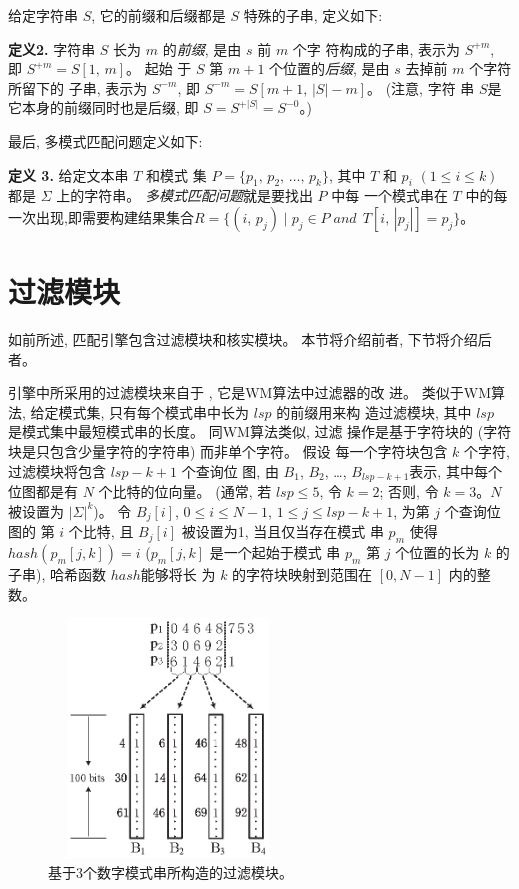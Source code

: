 给定字符串 $S$, 它的前缀和后缀都是 $S$ 特殊的子串, 定义如下:

\textbf{定义2.} 字符串 $S$ 长为 $m$ 的\emph{前缀}, 是由 $s$ 前 $m$ 个字
符构成的子串, 表示为 $S^{+m}$, 即 $S^{+m}=S[1,\,m]$。  起始
于 $S$ 第 $m+1$ 个位置的\emph{后缀}, 是由 $s$ 去掉前 $m$ 个字符所留下的
子串, 表示为 $S^{-m}$, 即 $S^{-m} = S[m+1,\,|S|-m]$。 (注意, 字符
串 $S$是它本身的前缀同时也是后缀, 即 $S=S^{+|S|}=S^{-0}$。)

最后, 多模式匹配问题定义如下:

\textbf{定义 3.} 给定文本串 $T$ 和模式
集 $P=\{p_1,\,p_2,\,\dots,\,p_k\}$, 其中 $T$ 和 $p_i$ $(1 \leq i \leq
k)$ 都是 $\Sigma$ 上的字符串。 \emph{多模式匹配问题}就是要找出 $P$ 中每
一个模式串在 $T$
中的每一次出现,即需要构建结果集合$R = \{(i,\, p_j)\;|\; p_j \in P\;
and\,\; T[i,\,|p_j|]=p_j\}$。


\section{过滤模块}
\label{sec:filter}

如前所述, 匹配引擎包含过滤模块和核实模块。 本节将介绍前者, 下节将介绍后
者。

引擎中所采用的过滤模块来自于 \cite{Lee2013}, 它是WM算法中过滤器的改
进。 类似于WM算法, 给定模式集, 只有每个模式串中长为 $lsp$ 的前缀用来构
造过滤模块, 其中 $lsp$ 是模式集中最短模式串的长度。 同WM算法类似, 过滤
操作是基于字符块的 (字符块是只包含少量字符的字符串) 而非单个字符。 假设
每一个字符块包含 $k$ 个字符, 过滤模块将包含 $lsp-k+1$ 个查询位
图, 由 $B_1$, $B_2$, \dots, $B_{lsp-k+1}$表示, 其中每个位图都是有 $N$
个比特的位向量。  (通常, 若 $lsp \leq 5$, 令 $k =
2$; 否则, 令 $k=3$。$N$ 被设置为 $|\Sigma|^k$)。 令 $B_j[i]$,
$0 \leq i \leq N - 1$, $1 \leq j \leq lsp-k+1$, 为第 $j$ 个查询位图的
第 $i$ 个比特, 且 $B_j[i]$ 被设置为1, 当且仅当存在模式
串 $p_m$ 使得 $hash(p_m[j,k]) = i$ ($p_m[j,k]$ 是一个起始于模式
串 $p_m$ 第 $j$ 个位置的长为 $k$ 的子串), 哈希函数 $hash$能够将长
为 $k$ 的字符块映射到范围在 $[0, N-1]$ 内的整数。

\begin{figure}[H]
  \centering
  \includegraphics[height=2.5in, width=2.5in]{figures/2_MPM/filter.eps}
  \caption{基于3个数字模式串所构造的过滤模块。}
  \label{fig:filter}
\end{figure}

